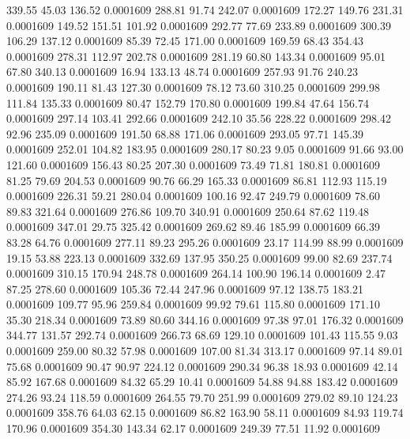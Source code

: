  339.55   45.03  136.52   0.0001609
 288.81   91.74  242.07   0.0001609
 172.27  149.76  231.31   0.0001609
 149.52  151.51  101.92   0.0001609
 292.77   77.69  233.89   0.0001609
 300.39  106.29  137.12   0.0001609
  85.39   72.45  171.00   0.0001609
 169.59   68.43  354.43   0.0001609
 278.31  112.97  202.78   0.0001609
 281.19   60.80  143.34   0.0001609
  95.01   67.80  340.13   0.0001609
  16.94  133.13   48.74   0.0001609
 257.93   91.76  240.23   0.0001609
 190.11   81.43  127.30   0.0001609
  78.12   73.60  310.25   0.0001609
 299.98  111.84  135.33   0.0001609
  80.47  152.79  170.80   0.0001609
 199.84   47.64  156.74   0.0001609
 297.14  103.41  292.66   0.0001609
 242.10   35.56  228.22   0.0001609
 298.42   92.96  235.09   0.0001609
 191.50   68.88  171.06   0.0001609
 293.05   97.71  145.39   0.0001609
 252.01  104.82  183.95   0.0001609
 280.17   80.23    9.05   0.0001609
  91.66   93.00  121.60   0.0001609
 156.43   80.25  207.30   0.0001609
  73.49   71.81  180.81   0.0001609
  81.25   79.69  204.53   0.0001609
  90.76   66.29  165.33   0.0001609
  86.81  112.93  115.19   0.0001609
 226.31   59.21  280.04   0.0001609
 100.16   92.47  249.79   0.0001609
  78.60   89.83  321.64   0.0001609
 276.86  109.70  340.91   0.0001609
 250.64   87.62  119.48   0.0001609
 347.01   29.75  325.42   0.0001609
 269.62   89.46  185.99   0.0001609
  66.39   83.28   64.76   0.0001609
 277.11   89.23  295.26   0.0001609
  23.17  114.99   88.99   0.0001609
  19.15   53.88  223.13   0.0001609
 332.69  137.95  350.25   0.0001609
  99.00   82.69  237.74   0.0001609
 310.15  170.94  248.78   0.0001609
 264.14  100.90  196.14   0.0001609
   2.47   87.25  278.60   0.0001609
 105.36   72.44  247.96   0.0001609
  97.12  138.75  183.21   0.0001609
 109.77   95.96  259.84   0.0001609
  99.92   79.61  115.80   0.0001609
 171.10   35.30  218.34   0.0001609
  73.89   80.60  344.16   0.0001609
  97.38   97.01  176.32   0.0001609
 344.77  131.57  292.74   0.0001609
 266.73   68.69  129.10   0.0001609
 101.43  115.55    9.03   0.0001609
 259.00   80.32   57.98   0.0001609
 107.00   81.34  313.17   0.0001609
  97.14   89.01   75.68   0.0001609
  90.47   90.97  224.12   0.0001609
 290.34   96.38   18.93   0.0001609
  42.14   85.92  167.68   0.0001609
  84.32   65.29   10.41   0.0001609
  54.88   94.88  183.42   0.0001609
 274.26   93.24  118.59   0.0001609
 264.55   79.70  251.99   0.0001609
 279.02   89.10  124.23   0.0001609
 358.76   64.03   62.15   0.0001609
  86.82  163.90   58.11   0.0001609
  84.93  119.74  170.96   0.0001609
 354.30  143.34   62.17   0.0001609
 249.39   77.51   11.92   0.0001609
